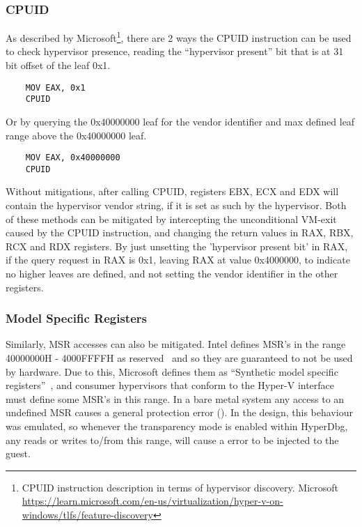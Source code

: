 \subsubsection{CPUID}
As described by Microsoft\footnote{CPUID instruction description in terms of hypervisor discovery. Microsoft \url{https://learn.microsoft.com/en-us/virtualization/hyper-v-on-windows/tlfs/feature-discovery}}, 
there are 2 ways the CPUID instruction can be used to check hypervisor presence, reading the “hypervisor present” bit that is at 31 bit offset of the leaf 0x1.
\begin{verbatim}
    MOV EAX, 0x1
    CPUID
\end{verbatim}
Or by querying the 0x40000000 leaf for the vendor identifier and max defined leaf range above the 0x40000000 leaf. 
\begin{verbatim}
    MOV EAX, 0x40000000
    CPUID
\end{verbatim}
Without mitigations, after calling CPUID, registers EBX, ECX and EDX will contain the hypervisor vendor string, if it is set as such by the hypervisor.
Both of these methods can be mitigated by intercepting the unconditional VM-exit caused by the CPUID instruction, and changing the return values in RAX, RBX, RCX and RDX registers. 
By just unsetting the 'hypervisor present bit' in RAX, if the query request in RAX is 0x1, leaving RAX at value 0x4000000, to indicate no higher leaves are defined, and not setting the vendor identifier in the other registers.

\subsubsection{Model Specific Registers}
Similarly, MSR accesses can also be mitigated. Intel defines MSR's in the range 40000000H - 4000FFFFH as reserved~\cite[Volume 4]{Intel-SDM2025} and so they are guaranteed to not be used by hardware. 
Due to this, Microsoft defines them as “Synthetic model specific registers”~\cite{microsoft_hv_interface_reqs}, and consumer hypervisors that conform to the Hyper-V  interface must define some MSR's in this range. 
In a bare metal system any access to an undefined MSR causes a general protection error (). In the design, this behaviour was emulated, 
so whenever the transparency mode is enabled within HyperDbg, any reads or writes to/from this range, will cause a  error to be injected to the guest.

